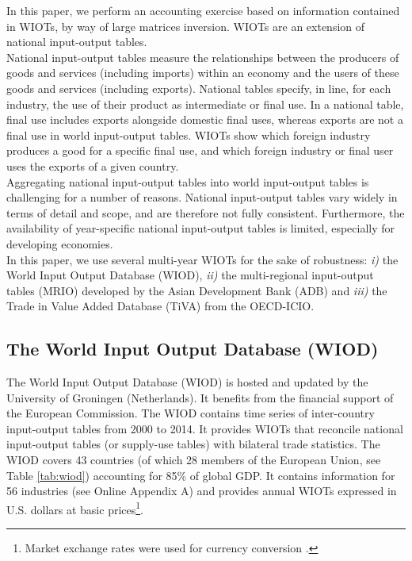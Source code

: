\documentclass[11pt,a4paper]{paper} %
\begin{document}
In this paper, we perform an accounting exercise based on information contained in WIOTs, by way of large matrices inversion. 
WIOTs are an extension of national input-output tables. \\
National input-output tables measure the relationships between the producers of goods and services (including imports) within an economy and the users of these goods and services (including exports). 
National tables specify, in line, for each industry, the use of their product as intermediate or final use. 
In a national table, final use includes exports alongside domestic final uses, whereas exports are not a final use in world input-output tables. 
WIOTs show which foreign industry produces a good for a specific final use, and which foreign industry or final user uses the exports of a given country. \\
Aggregating national input-output tables into world input-output tables is challenging for a number of reasons. National input-output tables vary widely in terms of detail and scope, and are therefore not fully consistent. Furthermore, the availability of year-specific national input-output tables is limited, especially for developing economies. \\
In this paper, we use several multi-year WIOTs for the sake of robustness: \textit{i)} the World Input Output Database (WIOD), \textit{ii)} the multi-regional input-output tables (MRIO) developed by the Asian Development Bank (ADB) and \textit{iii)} the Trade in Value Added Database (TiVA) from the OECD-ICIO.

\subsection{The World Input Output Database (WIOD)} 
The World Input Output Database (WIOD) is hosted and updated by the University of Groningen (Netherlands). 
It benefits from the financial support of the European Commission. 
The WIOD contains time series of inter-country input-output tables from 2000 to 2014. 
It provides WIOTs that reconcile national input-output tables (or supply-use tables) with bilateral trade statistics.
The WIOD covers 43 countries (of which 28 members of the European Union, see Table \ref{tab:wiod}) accounting for 85\% of global GDP. 
It contains information for 56 industries (see Online Appendix A) and provides annual WIOTs expressed in U.S. dollars at basic prices\footnote{Market exchange rates were used for currency conversion \citep{Timmer2015}.}. 
\end{document}
